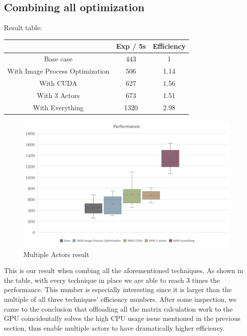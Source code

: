 \documentclass[sigconf]{acmart}
\begin{document}
\subsection{Combining all optimization}
Result table:
\begin{center}
  \begin{tabular}{ |c|c|c| } 
   \hline
    & Exp / 5s & Efficiency \\ 
   \hline
   Base case & 443 & 1 \\ 
   \hline
   With Image Process Optimization & 506 & 1.14 \\ 
   \hline
   With CUDA & 627 & 1.56 \\ 
   \hline
   With 3 Actors & 673 & 1.51 \\ 
   \hline
   With Everything & 1320 & 2.98\\ 
   \hline
  \end{tabular}
\end{center}
\begin{figure}[h]
  \centering
  \includegraphics[width=\columnwidth]{all_r.png}
  \caption{Multiple Actors result}
\end{figure}
This is our result when combing all the aforementioned techniques. As shown in the table, with every technique in place we are able to reach 3 times the performance. This number is especially interesting since it is larger than the multiple of all three techniques' efficiency numbers. After some inspection, we came to the conclusion that offloading all the matrix calculation work to the GPU coincidentally solves the high CPU usage issue mentioned in the previous section, thus enable multiple actors to have dramatically higher efficiency.
\end{document}
